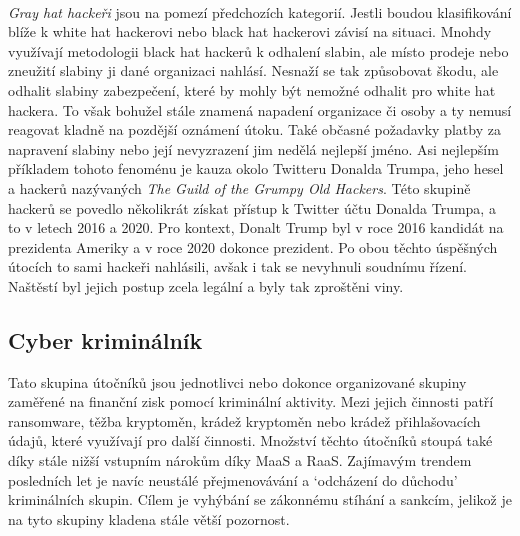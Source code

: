 \paragraph{}
\textit{Gray hat hackeři} jsou na pomezí předchozích kategorií.
Jestli boudou klasifikování blíže k white hat hackerovi nebo black hat hackerovi závisí na situaci.
Mnohdy využívají metodologii black hat hackerů k odhalení slabin, ale místo prodeje nebo zneužití slabiny ji dané organizaci nahlásí.
Nesnaží se tak způsobovat škodu, ale odhalit slabiny zabezpečení, které by mohly být nemožné odhalit pro white hat hackera.
To však bohužel stále znamená napadení organizace či osoby a ty nemusí reagovat kladně na pozdější oznámení útoku.
Také občasné požadavky platby za napravení slabiny nebo její nevyzrazení jim nedělá nejlepší jméno.
Asi nejlepším příkladem tohoto fenoménu je kauza okolo Twitteru Donalda Trumpa, jeho hesel a hackerů nazývaných \textit{The Guild of the Grumpy Old Hackers}\cite{darknet_87_grumpy}.
Této skupině hackerů se povedlo několikrát získat přístup k Twitter účtu Donalda Trumpa, a to v letech 2016 a 2020.
Pro kontext, Donalt Trump byl v roce 2016 kandidát na prezidenta Ameriky a v roce 2020 dokonce prezident.
Po obou těchto úspěšných útocích to sami hackeři nahlásili, avšak i tak se nevyhnuli soudnímu řízení.
Naštěstí byl jejich postup zcela legální a byly tak zproštěni viny.

\subsection{Cyber kriminálník}
Tato skupina útočníků jsou jednotlivci nebo dokonce organizované skupiny zaměřené na finanční zisk pomocí kriminální aktivity.
Mezi jejich činnosti patří ransomware, těžba kryptoměn, krádež kryptoměn nebo krádež přihlašovacích údajů, které využívají pro další činnosti.
Množství těchto útočníků stoupá také díky stále nižší vstupním nárokům díky \ac{MaaS}\cite{MaaS_ATaT} a \ac{RaaS}\cite{RaaS_microsoft}.
Zajímavým trendem posledních let je navíc neustálé přejmenovávání a `odcházení do důchodu' kriminálních skupin.
Cílem je vyhýbání se zákonnému stíhání a sankcím, jelikož je na tyto skupiny kladena stále větší pozornost.

